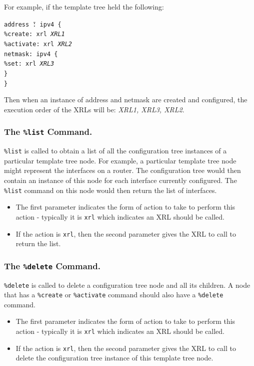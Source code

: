 \documentclass[11pt]{article}
\begin{document}
For example, if the template tree held the following:
\begin{tabbing}
\tt addr\=\tt ess \=\tt@: ipv4 \{\\
    \>\tt\%create: xrl {\it XRL1}\\
    \>\tt\%activate: xrl {\it XRL2}\\
    \>\tt netmask: ipv4 \{\\
        \>\>\tt\%set: xrl {\it XRL3}\\
    \>\tt\}\\
\tt\}
\end{tabbing}
Then when an instance of address and netmask are created and
configured, the execution order of the XRLs will be: {\it XRL1, XRL3, XRL2}.

\subsubsection{The {\tt \%list} Command.}
{\tt \%list} is called to obtain a list of all the configuration tree
instances of a particular template tree node.  For example, a
particular template tree node might represent the interfaces on a
router.  The configuration tree would then contain an instance of this
node for each interface currently configured.  The {\tt \%list}
command on this node would then return the list of interfaces.
\begin{itemize}
\item The first parameter indicates the form of action to take to perform
this action - typically it is {\tt xrl} which indicates an XRL should
be called.
\item If the action is {\tt xrl}, then the second parameter gives the XRL to
call to return the list.
\end{itemize}

\subsubsection{The {\tt \%delete} Command.}
{\tt \%delete} is called to delete a configuration tree node and all its
children.  A node that has a {\tt \%create} or {\tt \%activate}
command should also have a {\tt \%delete} command.
\begin{itemize}
\item The first parameter indicates the form of action to take to perform
this action - typically it is {\tt xrl} which indicates an XRL should
be called.
\item If the action is {\tt xrl}, then the second parameter gives the XRL to
call to delete the configuration tree instance of this template tree
node.
\end{itemize}
\end{document}
